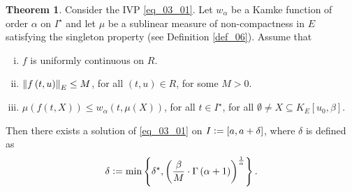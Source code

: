 \documentclass[reqno]{amsart}
\numberwithin{equation}{section}
\theoremstyle{definition}
\newtheorem{theorem}{Theorem}
\theoremstyle{remark}
\newcommand{\ball}[3]{K_{#1}\sbr{#2,#3}}
\newcommand{\br}[1]{\left(#1\right)}
\newcommand{\cbr}[1]{\left\{#1\right\}}
\newcommand{\definitionRef}[1]{\textrm{Definition \ref{#1}}}
\newcommand{\defeq}{\vcentcolon=}
\newcommand{\sbr}[1]{\left[#1\right]}
\newcommand{\sdelta}{\delta^{\star}}
\newcommand{\sI}{I^{\star}}
\begin{document}
	\begin{theorem}\label{thm_14}
		Consider the IVP \eqref{eq_03_01}. Let $w_{\alpha}$ be a Kamke function of order $\alpha$ on $\sI$ and let $\mu$ be a sublinear measure of non-compactness in $E$ satisfying the singleton property (see \definitionRef{def_06}). Assume that
		\begin{enumerate}[(i)]
			\item $f$ is uniformly continuous on $R$.
			\item $\norm{f\br{t,u}}_E\leq{M}$, for all $\br{t,u}\in{R}$, for some $M>0$.\label{th_03_01_ass_02}
			\item $\mu\br{f\br{t,X}}\leq{w}_{\alpha}\br{t,\mu\br{X}}$, for all $t\in\sI$, for all $\emptyset\neq{X}\subseteq\ball{E}{u_0}{\beta}$.\label{th_03_01_ass_03}
		\end{enumerate}
		Then there exists a solution of \eqref{eq_03_01} on $I\defeq\sbr{a,a+\delta}$, where $\delta$ is defined as
		\begin{equation}\label{eq_03_02}
			\delta\defeq\min\cbr{\sdelta,\br{\frac{\beta}{M}\cdot\Gamma\br{\alpha+1}}^{\frac{1}{\alpha}}}.
		\end{equation}
	\end{theorem}
\end{document}
